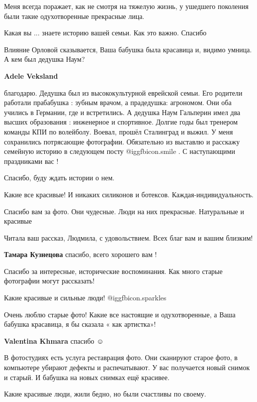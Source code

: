 \begin{itemize}
Меня всегда поражает, как не смотря на тяжелую жизнь, у ушедшего поколения были
такие одухотворенные прекрасные лица.

Какая вы ... знаете историю вашей семьи. Как это важно. Спасибо

Влияние Орловой сказывается, Ваша бабушка была красавица и, видимо умница. А
кем был дедушка Наум?

\begin{itemize} %
\textbf{Adele Veksland} 

благодарю. Дедушка был из высококультурной еврейской семьи. Его родители
работали прабабушка : зубным врачом, а прадедушка: агрономом. Они оба учились в
Германии, где и встретились. А дедушка Наум Гальперин имел два высших
образования : инженерное и спортивное. Долгие годы был тренером команды КПИ по
волейболу. Воевал, прошёл Сталинград и выжил. У меня сохранились потрясающие
фотографии. Обязательно из выставлю и расскажу семейную историю в следующем
посту @igg{fbicon.smile} . С наступающими праздниками вас !


Спасибо, буду ждать истории о нем.
\end{itemize} %

Какие все красивые! И никаких силиконов и ботексов. Каждая-индивидуальность.

Спасибо вам за фото. Они чудесные. Люди на них прекрасные. Натуральные и красивые

Читала ваш рассказ, Людмила, с удовольствием. Всех благ вам и вашим близким!

\textbf{Тамара Кузнецова} спасибо, всего хорошего вам !

Спасибо за интересные, исторические воспоминания. Как много старые фотографии могут рассказать!

Какие красивые и сильные люди!  @igg{fbicon.sparkles} 

Очень люблю старые фото! Какие все настоящие и одухотворенные, а Ваша бабушка красавица, я бы сказала « как артистка»!

\textbf{Valentina Khmara} спасибо  ☺ ️ 


В фотостудиях есть услуга реставрация фото. Они сканируют старое фото, в
компьютере убирают дефекты и распечатывают. У вас получается новый снимок и
старый. И бабушка на новых снимках ещё красивее.


Какие красивые люди, жили бедно, но были счастливы по своему.

\end{itemize} %
